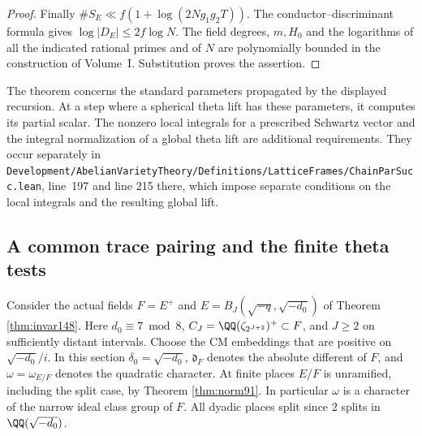 \documentclass[a4paper,11pt]{article}
\theoremstyle{definition}
\theoremstyle{remark}
\newcommand{\srcloc}[2]{{\small\nolinkurl{#1.lean}}, line~#2}
\numberwithin{equation}{section}
\begin{document}
\begin{proof}
Finally \(\#S_E\ll f(1+\log(2Ng_1g_2T))\). The
conductor--discriminant formula gives
\(\log|D_E|\le 2f\log N\). The field degrees, \(m,H_0\)
and the logarithms of all the indicated rational primes and
of \(N\) are polynomially bounded in the construction of
Volume~I. Substitution proves the assertion.
\end{proof}

The theorem concerns the standard parameters propagated by
the displayed recursion. At a step where a spherical theta
lift has these parameters, it computes its partial scalar.
The nonzero local integrals for a prescribed Schwartz vector
and the integral normalization of a global theta lift are
additional requirements. They occur separately in
\srcloc{Development/AbelianVarietyTheory/Definitions/LatticeFrames/ChainParSucc}{197}
and line 215 there, which impose separate conditions on the
local integrals and the resulting global lift.

\subsection{A common trace pairing and the finite theta tests}\label{nav:VIII-04}
\label{sec:lattices173}

Consider the actual fields \(F=E^+\) and
\(E=B_J(\sqrt{-q},\sqrt{-d_0})\) of Theorem \ref{thm:invar148}.
Here \(d_0\equiv7\bmod8\), \(C_J=\QQ(\zeta_{2^{J+2}})^+
\subset F\), and \(J\ge2\) on sufficiently distant intervals.
Choose the CM embeddings that are positive on
\(\sqrt{-d_0}/i\). In this section \(\delta_0=\sqrt{-d_0}\),
\(\mathfrak d_F\) denotes the absolute different of \(F\),
and \(\omega=\omega_{E/F}\) denotes the quadratic character.
At finite places \(E/F\) is unramified, including the split
case, by Theorem \ref{thm:norm91}. In particular \(\omega\)
is a character of the narrow ideal class group of \(F\).
All dyadic places split since \(2\) splits in \(\QQ(\sqrt{-d_0})\).
\end{document}
